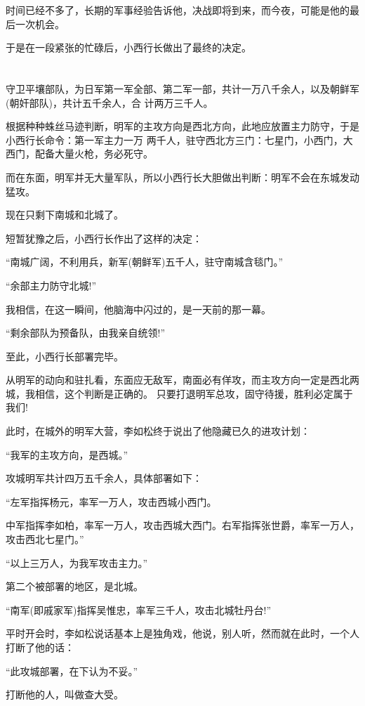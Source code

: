 \documentclass[11pt,a4paper,onecolumn]{article}
\begin{document}
时间已经不多了，长期的军事经验告诉他，决战即将到来，而今夜，可能是他的最后一次机会。

于是在一段紧张的忙碌后，小西行长做出了最终的决定。

\section[\thesection]{}

守卫平壤部队，为日军第一军全部、第二军一部，共计一万八千余人，以及朝鲜军(朝奸部队)，共计五千余人，合
计两万三千人。

根据种种蛛丝马迹判断，明军的主攻方向是西北方向，此地应放置主力防守，于是小西行长命令：第一军主力一万
两千人，驻守西北方三门：七星门，小西门，大西门，配备大量火枪，务必死守。

而在东面，明军并无大量军队，所以小西行长大胆做出判断：明军不会在东城发动猛攻。

现在只剩下南城和北城了。

短暂犹豫之后，小西行长作出了这样的决定：

``南城广阔，不利用兵，新军(朝鲜军)五千人，驻守南城含毯门。''

``余部主力防守北城!''

我相信，在这一瞬间，他脑海中闪过的，是一天前的那一幕。

``剩余部队为预备队，由我亲自统领!''

至此，小西行长部署完毕。

从明军的动向和驻扎看，东面应无敌军，南面必有佯攻，而主攻方向一定是西北两城，我相信，这个判断是正确的。
只要打退明军总攻，固守待援，胜利必定属于我们!

此时，在城外的明军大营，李如松终于说出了他隐藏已久的进攻计划：

``我军的主攻方向，是西城。''

攻城明军共计四万五千余人，具体部署如下：

``左军指挥杨元，率军一万人，攻击西城小西门。

中军指挥李如柏，率军一万人，攻击西城大西门。右军指挥张世爵，率军一万人，攻击西北七星门。''

``以上三万人，为我军攻击主力。''

第二个被部署的地区，是北城。

``南军(即戚家军)指挥吴惟忠，率军三千人，攻击北城牡丹台!''

平时开会时，李如松说话基本上是独角戏，他说，别人听，然而就在此时，一个人打断了他的话：

``此攻城部署，在下认为不妥。''

打断他的人，叫做查大受。
\end{document}
